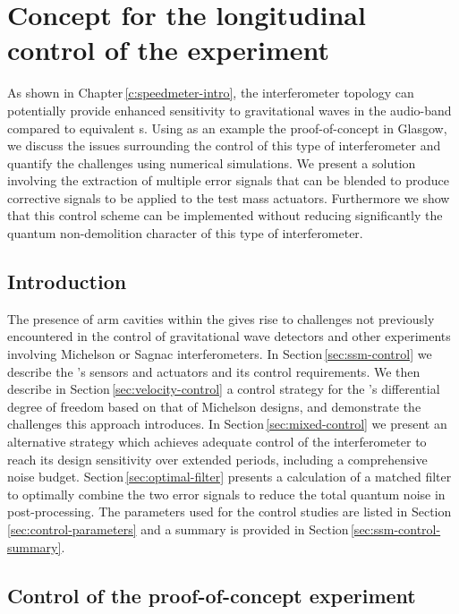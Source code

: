\chapter{\label{c:speedmeter-control}Concept for the longitudinal control of the \SSM{} experiment}

\newcommand{\RT}{$\textrm{R}_{\textrm{T}}$}

As shown in Chapter\,\ref{c:speedmeter-intro}, the \SSM{} interferometer topology can potentially provide enhanced sensitivity to gravitational waves in the audio-band compared to equivalent \MI{}s. Using as an example the proof-of-concept \SSMEXPT{} in Glasgow, we discuss the issues surrounding the control of this type of interferometer and quantify the challenges using numerical simulations. We present a solution involving the extraction of multiple error signals that can be blended to produce corrective signals to be applied to the test mass actuators. Furthermore we show that this control scheme can be implemented without reducing significantly the quantum non-demolition character of this type of interferometer.

\section{Introduction}
The presence of arm cavities within the \SSMEXPT{} gives rise to challenges not previously encountered in the control of gravitational wave detectors and other experiments involving Michelson or Sagnac interferometers. In Section\,\ref{sec:ssm-control} we describe the \SSMEXPT{}'s sensors and actuators and its control requirements. We then describe in Section\,\ref{sec:velocity-control} a control strategy for the \SSM{}'s differential degree of freedom based on that of Michelson designs, and demonstrate the challenges this approach introduces. In Section\,\ref{sec:mixed-control} we present an alternative strategy which achieves adequate control of the interferometer to reach its design sensitivity over extended periods, including a comprehensive noise budget. Section\,\ref{sec:optimal-filter} presents a calculation of a matched filter to optimally combine the two error signals to reduce the total quantum noise in post-processing. The parameters used for the control studies are listed in Section\,\ref{sec:control-parameters} and a summary is provided in Section\,\ref{sec:ssm-control-summary}.

\section{\label{sec:ssm-control}Control of the proof-of-concept experiment}

